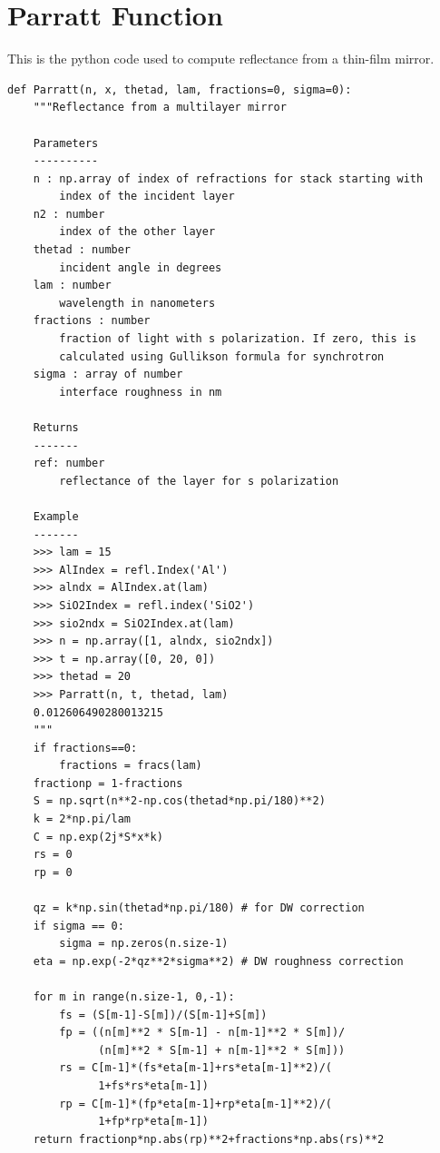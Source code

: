 \documentclass[english]{scrartcl}
\begin{document}
\section{Parratt Function\label{sec:Parratt-py}}
This is the python code used to compute reflectance from a thin-film
mirror.
\begin{lstlisting}
def Parratt(n, x, thetad, lam, fractions=0, sigma=0):
    """Reflectance from a multilayer mirror
    
    Parameters
    ----------
    n : np.array of index of refractions for stack starting with 
        index of the incident layer
    n2 : number
        index of the other layer
    thetad : number
        incident angle in degrees
    lam : number
        wavelength in nanometers
    fractions : number
        fraction of light with s polarization. If zero, this is
        calculated using Gullikson formula for synchrotron
    sigma : array of number
        interface roughness in nm
        
    Returns
    -------
    ref: number
        reflectance of the layer for s polarization
        
    Example
    -------
    >>> lam = 15
    >>> AlIndex = refl.Index('Al')
    >>> alndx = AlIndex.at(lam)
    >>> SiO2Index = refl.index('SiO2')
    >>> sio2ndx = SiO2Index.at(lam)
    >>> n = np.array([1, alndx, sio2ndx])
    >>> t = np.array([0, 20, 0])
    >>> thetad = 20
    >>> Parratt(n, t, thetad, lam)
    0.012606490280013215
    """
    if fractions==0:
        fractions = fracs(lam)
    fractionp = 1-fractions
    S = np.sqrt(n**2-np.cos(thetad*np.pi/180)**2)
    k = 2*np.pi/lam
    C = np.exp(2j*S*x*k)
    rs = 0
    rp = 0
    
    qz = k*np.sin(thetad*np.pi/180) # for DW correction
    if sigma == 0:
        sigma = np.zeros(n.size-1)
    eta = np.exp(-2*qz**2*sigma**2) # DW roughness correction
    
    for m in range(n.size-1, 0,-1):
        fs = (S[m-1]-S[m])/(S[m-1]+S[m])
        fp = ((n[m]**2 * S[m-1] - n[m-1]**2 * S[m])/
              (n[m]**2 * S[m-1] + n[m-1]**2 * S[m]))
        rs = C[m-1]*(fs*eta[m-1]+rs*eta[m-1]**2)/(
              1+fs*rs*eta[m-1])
        rp = C[m-1]*(fp*eta[m-1]+rp*eta[m-1]**2)/(
              1+fp*rp*eta[m-1])
    return fractionp*np.abs(rp)**2+fractions*np.abs(rs)**2
     
\end{lstlisting}
\end{document}
